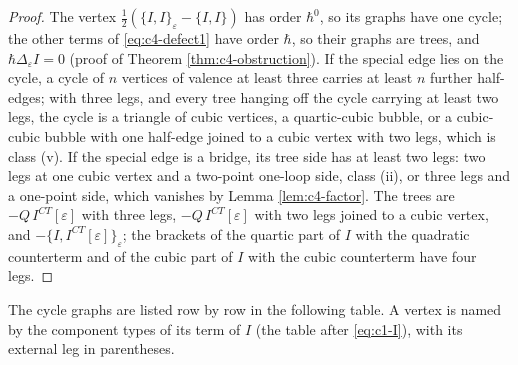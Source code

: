 \begin{proof}
The vertex $\tfrac12(\{I,I\}_\varepsilon-\{I,I\})$ has order $\hbar^0$, so its graphs have one cycle; the other terms of \eqref{eq:c4-defect1} have order $\hbar$, so their graphs are trees, and $\hbar\Delta_\varepsilon I=0$ (proof of Theorem \ref{thm:c4-obstruction}). If the special edge lies on the cycle, a cycle of $n$ vertices of valence at least three carries at least $n$ further half-edges; with three legs, and every tree hanging off the cycle carrying at least two legs, the cycle is a triangle of cubic vertices, a quartic-cubic bubble, or a cubic-cubic bubble with one half-edge joined to a cubic vertex with two legs, which is class (v). If the special edge is a bridge, its tree side has at least two legs: two legs at one cubic vertex and a two-point one-loop side, class (ii), or three legs and a one-point side, which vanishes by Lemma \ref{lem:c4-factor}. The trees are $-Q\,I^{CT}[\varepsilon]$ with three legs, $-Q\,I^{CT}[\varepsilon]$ with two legs joined to a cubic vertex, and $-\{I,I^{CT}[\varepsilon]\}_\varepsilon$; the brackets of the quartic part of $I$ with the quadratic counterterm and of the cubic part of $I$ with the cubic counterterm have four legs.
\end{proof}

The cycle graphs are listed row by row in the following table. A vertex is named by the component types of its term of $I$ (the table after \eqref{eq:c1-I}), with its external leg in parentheses.

